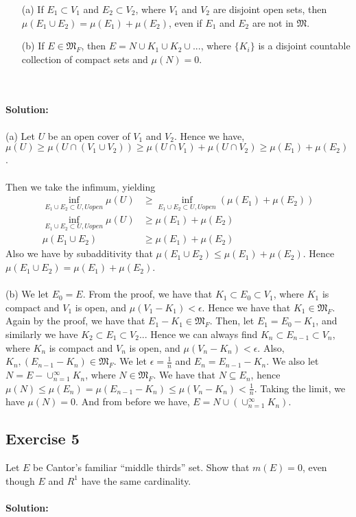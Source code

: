 \documentclass{article}
\begin{document}
\begin{enumerate}
    \item[(a)]  If $E_1 \subset V_1$ and $E_2 \subset V_2$, where $V_1$ and $V_2$ are disjoint open sets,
                then $\mu(E_1 \cup E_2) = \mu(E_1) + \mu(E_2)$, even if $E_1$ and $E_2$ are not in $\mathfrak{M}$.
    \item[(b)]  If $E \in \mathfrak{M}_F$, then $E = N \cup K_1 \cup K_2 \cup ...$, where $\{K_i\}$ is a disjoint countable
                collection of compact sets and $\mu(N) = 0$.
\end{enumerate}
\\\\
\textbf{Solution:}
\\\\
(a) Let $U$ be an open cover of $V_1$ and $V_2$.
Hence we have, $\mu(U) \ge \mu(U \cap (V_1 \cup V_2)) \ge \mu(U \cap V_1) + \mu(U \cap V_2) \ge \mu(E_1) +  \mu(E_2)$.
\\\\
Then we take the infimum, yielding
\begin{equation*}
    \begin{aligned}
        \inf_{E_1\cup E_2 \subset U, U open} \mu(U) & \ge  \inf_{E_1\cup E_2 \subset U, U open} (\mu(E_1) +  \mu(E_2))\\
        \inf_{E_1\cup E_2 \subset U, U open} \mu(U) & \ge \mu(E_1) +  \mu(E_2)\\
        \mu(E_1 \cup E_2) & \ge \mu(E_1) +  \mu(E_2)
    \end{aligned}
\end{equation*}
Also we have by subadditivity that $\mu(E_1 \cup E_2) \le \mu(E_1) + \mu(E_2)$.
Hence $\mu(E_1 \cup E_2) = \mu(E_1) + \mu(E_2)$.
\\\\
(b) We let $E_0 = E$. From the proof, we have that $K_1 \subset E_0 \subset V_1$, where $K_1$ is compact
and $V_1$ is open, and $\mu(V_1 - K_1)<\epsilon$. Hence we have that $K_1 \in \mathfrak{M}_F$. Again by the proof, we have that $E_1 - K_1 \in \mathfrak{M}_F$.
Then, let $E_1 = E_0-K_1$, and similarly we have $K_2 \subset E_1 \subset V_2$... Hence we can always find
$K_n \subset E_{n-1}\subset V_n$, where $K_n$ is compact and $V_n$ is open, and $\mu(V_n - K_n)<\epsilon$. Also, $K_n, (E_{n-1}-K_{n}) \in \mathfrak{M}_F$.
We let $\epsilon = \frac{1}{n}$ and $E_n = E_{n-1} - K_n$. We also let $N = E - \cup_{n=1}^{\infty}K_n$, where $N\in \mathfrak{M}_F$.
We have that $N \subseteq E_n$, hence $\mu(N) \le \mu(E_n) = \mu(E_{n-1} - K_n) \le \mu(V_n - K_n) < \frac{1}{n}$.
Taking the limit, we have $\mu(N) = 0$. And from before we have, $E = N \cup (\cup_{n=1}^{\infty}K_n)$.

\subsection*{Exercise 5}
Let $E$ be Cantor's familiar ``middle thirds'' set.
Show that $m(E)=0$, even though $E$ and $R^1$ have the same cardinality.
\\\\
\textbf{Solution:}
\end{document}
